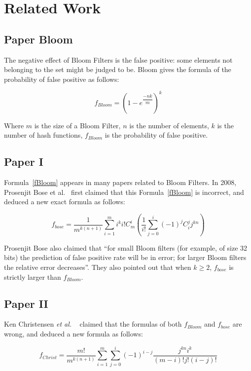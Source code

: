 \section{Related Work}
\subsection{Paper Bloom}
The negative effect of Bloom Filters is the false positive: some elements not belonging to the set might be judged to be. Bloom gives the formula of the probability of false positive as follows:

\begin{equation}
\label{fBloom}
f_{Bloom}=\left( 1-e^{\dfrac{-nk}{m}} \right)^k
\end{equation}

Where $m$ is the size of a Bloom Filter, $n$ is the number of elements, $k$ is the number of hash functions, $f_{Bloom}$ is the probability of false positive.

\subsection{Paper I}
Formula~\ref{fBloom} appears in many papers related to Bloom Filters. In 2008, Prosenjit Bose et al.~\cite{bose2008false} first claimed that this Formula~\ref{fBloom} is incorrect, and deduced a new exact formula as follows:


\begin{equation}
\label{fBose}
f_{bose}=\dfrac{1}{m^{k(n+1)}}  \sum\limits_{i=1}^{m}i^k i!C_m^i  \left(\dfrac{1}{i!} \sum\limits_{j=0}^{i} (-1)^j C_i^j j^{kn}\right)
\end{equation}

Prosenjit Bose also claimed that ``for small Bloom filters (for example, of size 32 bits) the prediction of false positive rate will be in error; for larger Bloom filters the relative error decreases''. They also pointed out that when $k \geq  2$, $f_{bose}$ is strictly larger than $f_{Bloom}$.


\subsection{Paper II}
Ken Christensen \textit{et al.} ~\cite{ken2010false} claimed that the formulas of both $f_{Bloom}$ and $f_{bose}$ are wrong, and deduced a new formula as follows:

\begin{equation}
\label{fChristen}
f_{Christ}=\dfrac{m!}{m^{k(n+1)}}\sum\limits_{i=1}^{m} \sum\limits_{j=0}^{i} (-1)^{i-j}  \dfrac{j^{kn}i^k}{(m-i)!j!(i-j)!}
\end{equation}


